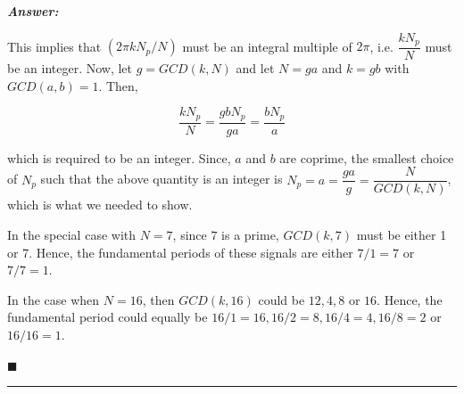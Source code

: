 \documentclass[12pt]{article}
\theoremstyle{definition}
\newenvironment{answer}{
    \textbf{\textit{Answer:}} \qquad
}{\hfill $\blacksquare$ \\ 

\begin{center}
    \rule{0.8\linewidth}{1.5px} 
    \vspace*{1cm}   
\end{center}
}
\begin{document}
\begin{answer}
\begin{enumerate}
        This implies that $(2\pi k N_p / N)$ must be an integral multiple of $2\pi$, i.e. $\dfrac{k N_p}{N}$ must be an integer. Now, let $g = GCD(k, N)$ and let $N = ga$ and $k = gb$ with $GCD(a, b) = 1$. Then,

        $$
        \dfrac{kN_p}{N} = \dfrac{gb N_p}{ga} = \dfrac{b N_p}{a}
        $$

        which is required to be an integer. Since, $a$ and $b$ are coprime, the smallest choice of $N_p$ such that the above quantity is an integer is $N_p = a = \dfrac{ga}{g} = \dfrac{N}{GCD(k, N)}$, which is what we needed to show.

        In the special case with $N = 7$, since $7$ is a prime, $GCD(k, 7)$ must be either 1 or 7. Hence, the fundamental periods of these signals are either $7/1 = 7$ or $7/7 = 1$.

        In the case when $N = 16$, then $GCD(k, 16)$ could be $1 2, 4, 8$ or $16$. Hence, the fundamental period could equally be $16/1 = 16, 16/2 = 8, 16/4 = 4, 16/8 = 2$ or $16/16 = 1$.
    \end{enumerate}
\end{answer}
\end{document}
